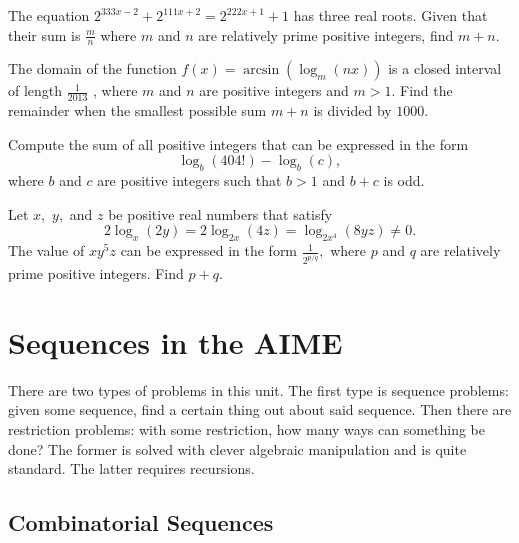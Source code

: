 \documentclass[blue,onecol]{shooting}
\begin{document}
\begin{req}[AIME I 2005/8]{6}
The equation $2^{333x-2} + 2^{111x+2} = 2^{222x+1} + 1$ has three real roots. Given that their sum is $\frac mn$ where $m$ and $n$ are relatively prime positive integers, find $m+n.$
\end{req}

\begin{prob}[AIME I 2013/8]{6}
The domain of the function $f(x) = \arcsin(\log_{m}(nx))$ is a closed interval of length $\frac{1}{2013}$ , where $m$ and $n$ are positive integers and $m>1$. Find the remainder when the smallest possible sum $m+n$ is divided by $1000.$
\end{prob}

\begin{prob}{7}
Compute the sum of all positive integers that can be expressed in the form \[\log_b(404!) - \log_b(c), \] where $b$ and $c$ are positive integers such that $b>1$ and $b+c$ is odd.
\end{prob}

\begin{prob}[AIME I 2012/9]{9}
Let $x,$ $y,$ and $z$ be positive real numbers that satisfy \[2\log_{x}(2y) = 2\log_{2x}(4z) = \log_{2x^4}(8yz) \ne 0.\] The value of $xy^5z$ can be expressed in the form $\frac{1}{2^{p/q}},$ where $p$ and $q$ are relatively prime positive integers. Find $p+q.$
\end{prob}


\chapter{Sequences in the AIME}











There are two types of problems in this unit. The first type is sequence problems: given some sequence, find a certain thing out about said sequence. Then there are restriction problems: with some restriction, how many ways can something be done? The former is solved with clever algebraic manipulation and is quite standard. The latter requires recursions.

\section{Combinatorial Sequences}
\end{document}
